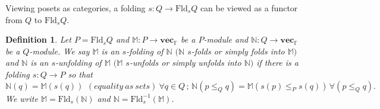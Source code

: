 \documentclass[11pt]{article}
\theoremstyle{plain}%
\newtheorem{definition}{Definition}[section]
\newcommand{\N}{\mathbb{N}}
\newcommand{\vecsp}{\mathbf{vec}_{\mathbb{F}}}
\newcommand{\M}{\mathbb{M}}
\newcommand{\Fld}{\mathrm{Fld}}
\newcommand{\cheng}[1]		{{ \textcolor{darkred} { #1}}}
\begin{document}
Viewing posets as categories, a folding $s:Q\rightarrow \Fld_s Q$ can be viewed as a functor from $Q$ to $\Fld_s Q$.

\begin{definition}
Let $P=\Fld_s Q$ and $\M:P\to \vecsp$ be a $P$-module and $\N:Q\to \vecsp$ be a  $Q$-module. We say $\M$ is an $s$-folding of $\N$ $(\N$ $s$-folds or simply folds into $\M)$ and $\N$ is an $s$-unfolding of $\M$ $(\M$ $s$-unfolds or simply unfolds into $\N)$ 
if there is a folding $s:Q\rightarrow P$ so that
\begin{equation}
     \N(q)=\M(s(q))\, ~(equality~as~sets)~ \forall q\in Q\,;\, \N(p\leq_Q q)=\M(s(p)\leq_{P} s(q))\, 
    \forall (p \leq_Q q). \label{eq:folding}
\end{equation}
We write $\M=\Fld_s(\N)$ and $\N=\Fld_s^{-1}(\M)$.
\label{def:folding}
\end{definition}

\end{document}

